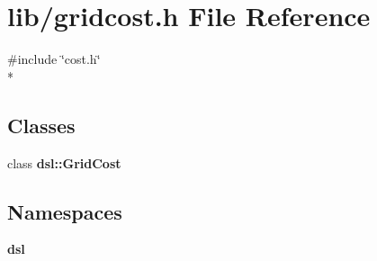 \section{lib/gridcost.h File Reference}
\label{lib_2gridcost_8h}
{\ttfamily \#include \char`\"{}cost.\-h\char`\"{}}\\*
\subsection*{Classes}
\begin{DoxyCompactItemize}
\item 
class {\bf dsl\-::\-Grid\-Cost}
\end{DoxyCompactItemize}
\subsection*{Namespaces}
\begin{DoxyCompactItemize}
\item 
{\bf dsl}
\end{DoxyCompactItemize}
